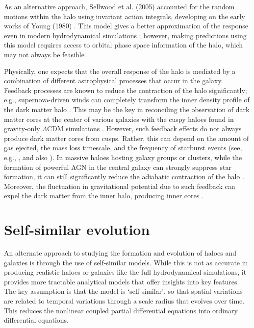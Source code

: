 As an alternative approach, Sellwood et al. (2005) \citep[][]{2005ApJ...634...70S} accounted for the random motions within the halo using invariant action integrals, developing on the early works of Young (1980) \citep{1980ApJ...242.1232Y}. This model gives a better approximation of the response even in modern hydrodynamical simulations \citep{2020MNRAS.495...12C}; however, making predictions using this model requires access to orbital phase space information of the halo, which may not always be feasible.

Physically, one expects that the overall response of the halo is mediated by a combination of different astrophysical processes that occur in the galaxy. Feedback processes are known to reduce the contraction of the halo significantly; e.g., supernova-driven winds can completely transform the inner density profile of the dark matter halo \citep[][]{1996MNRAS.283L..72N}. This may be the key in reconciling the observation of dark matter cores at the center of various galaxies with the cuspy haloes found in gravity-only $\Lambda$CDM simulations \citep[see][for a review]{2014Natur.506..171P}. However, such feedback effects do not always produce dark matter cores from cusps. Rather, this can depend on the amount of gas ejected, the mass loss timescale, and the frequency of starburst events (see, e.g., \citealp{2011ApJ...736L...2O,2014ApJ...793...46O,2012MNRAS.421.3464P}, and also \citealp{bfln18}). In massive haloes hosting galaxy groups or clusters, while the formation of powerful AGN in the central galaxy can strongly suppress star formation, it can still significantly reduce the adiabatic contraction of the halo \citep[][]{2011MNRAS.414..195T}. Moreover, the fluctuation in gravitational potential due to such feedback can expel the dark matter from the inner halo, producing inner cores \citep[][]{2012MNRAS.422.3081M}.




\section{Self-similar evolution}
\label{sec:intro_self_sim}

An alternate approach to studying the formation and evolution of haloes and galaxies is through the use of self-similar models. While this is not as accurate in producing realistic haloes or galaxies like the full hydrodynamical simulations, it provides more tractable analytical models that offer insights into key features. The key assumption is that the model is `self-similar', so that spatial variations are related to temporal variations through a scale radius that evolves over time. This reduces the nonlinear coupled partial differential equations into ordinary differential equations.

